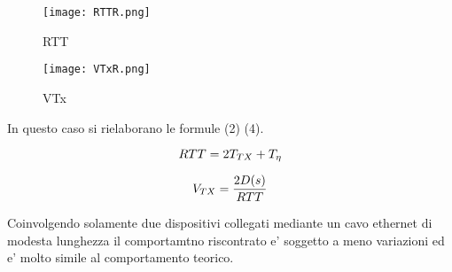 \documentclass[../lab2.tex]{subfiles}
\begin{document}
\begin{figure}[!htb]
    \begin{minipage}{0.48\textwidth}
        \centering
        \texttt{[image: RTTR.png]}
        \vspace{-20pt}
        \caption{RTT}\label{RTTR}
    \end{minipage}\hfill
    \begin{minipage}{0.48\textwidth}
        \centering
        \texttt{[image: VTxR.png]}
        \vspace{-20pt}
        \caption{VTx}\label{VTxR}
    \end{minipage}
\end{figure}

In questo caso si rielaborano le formule (2) (4).

\begin{equation}
    \centering
    RTT = 2T_{TX} + T_{\eta}
\end{equation}

\begin{equation}
    \centering
    V_{TX} = \frac{2D(s)}{RTT}
\end{equation}

Coinvolgendo solamente due dispositivi collegati mediante un cavo ethernet di modesta lunghezza
il comportamtno riscontrato e' soggetto a meno variazioni ed e' molto simile al comportamento 
teorico.
\end{document}
